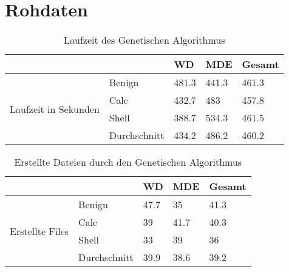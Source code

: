 \chapter{Rohdaten}
\begin{table}[]
\begin{tabular}{@{}lllll@{}}
\toprule
                                      &              & WD & MDE & Gesamt \\ \midrule
\multirow{4}{*}{Laufzeit in Sekunden} & Benign       & 481.3                         & 441.3                                      & 461.3               \\
                                      & Calc         & 432.7                         & 483                                        & 457.8               \\
                                      & Shell        & 388.7                         & 534.3                                      & 461.5               \\
                                      & Durchschnitt & 434.2                         & 486.2                                      & 460.2               \\ \cmidrule(l){2-5} 
\end{tabular}
\caption{Laufzeit des Genetischen Algorithmus}

\label{tab:runtime}
\end{table}

\begin{table}[]
\begin{tabular}{@{}lllll@{}}
\toprule
                                 &              & WD   & MDE  & Gesamt \\ \midrule
\multirow{4}{*}{Erstellte Files} & Benign       & 47.7 & 35   & 41.3   \\
                                 & Calc         & 39   & 41.7 & 40.3   \\
                                 & Shell        & 33   & 39   & 36     \\
                                 & Durchschnitt & 39.9 & 38.6 & 39.2   \\ \cmidrule(l){2-5} 
\end{tabular}
\caption{Erstellte Dateien durch den Genetischen Algorithmus}
\label{tab:created_files}
\end{table}

